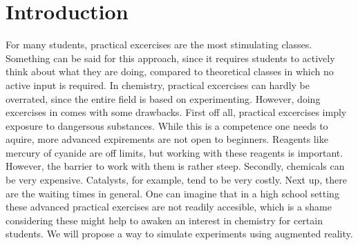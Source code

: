 \documentclass[%
    paper=A4,               %
    twoside=true,           %
    openany,              %
    parskip=full,           %
    chapterprefix=true,     %
    11pt,                   %
    headings=normal,        %
    bibliography=totoc,     %
    listof=totoc,           %
    titlepage=on,           %
    captions=tableabove,    %
    draft=false,            %
]{scrreprt}
\numberwithin{equation}{section}
\begin{document}
    \section{Introduction}
    \label{sec:intro}
    For many students, practical excercises are the most stimulating classes. Something can be said for this approach, since it requires students to actively think about what they
    are doing, compared to theoretical classes in which no active input is required. In chemistry, practical excercises can hardly be overrated, since the entire field is based on
    experimenting. However, doing excercises in comes with some drawbacks. First off all, practical excercises imply exposure to dangersous substances. While this is a competence one
    needs to aquire, more advanced expirements are not open to beginners. Reagents like mercury of cyanide are off limits, but working with these reagents is important. However, the
    barrier to work with them is rather steep. Secondly, chemicals can be very expensive. Catalysts, for example, tend to be very costly. Next up, there are the waiting times in 
    general. One can imagine that in a high school setting these advanced practical exercises are not readily accesible, which is a shame considering these might help to awaken an
    interest in chemistry for certain students. We will propose a way to simulate experiments using augmented reality. 
\end{document}
